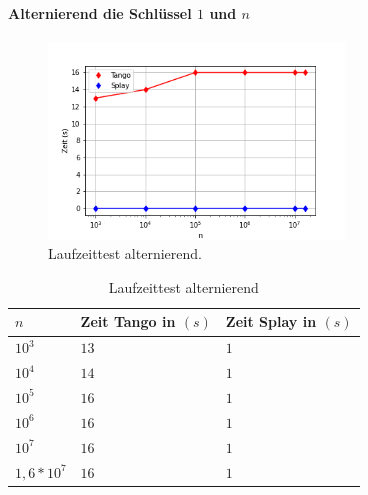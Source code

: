 \documentclass[a4paper,12pt]{article}
\begin{document}
\paragraph{Alternierend die Schlüssel $1$ und $n$}
\begin{figure}[H]
	\centering
	\includegraphics[width=0.7\textwidth]{"Medien/laufzeittest/diagramm/kleinGros"}
	\caption{Laufzeittest alternierend.}
\end{figure}
\begin{table}[H]
	\begin{center}
		\begin{tabular}[c]{|l|l|l|}
			\hline
			$n$ & Zeit Tango in $\left(s\right)$ &Zeit Splay in $\left(s\right)$ \\
			\hline
			$10^3$ & $13$ &$1$ \\
			\hline
			$10^4$  & $14$ &$1$  \\
			\hline
			$10^5$  & $16$ &$1$  \\
			\hline
			$10^6$  & $16$ &$1$  \\
			\hline
			$10^7$  & $16$ &$1$  \\
			\hline
			$1,6 *10^7$  & $16$ &$1$  \\
			\hline
		\end{tabular}
		\caption{Laufzeittest alternierend} 
	\end{center}
\end{table}
\end{document}
